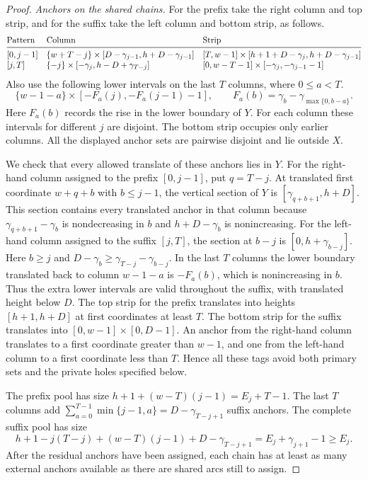 \documentclass[10pt]{article}
\numberwithin{equation}{section}
\theoremstyle{definition}
\begin{document}
\begin{proof}
\emph{Anchors on the shared chains.}
For the prefix take the right column and top strip, and for the suffix take the left column and bottom strip, as follows.
\[
\begin{array}{@{}l@{\quad}l@{\quad}l@{}}
 \text{Pattern}&\text{Column}&\text{Strip}\\
 \midrule
 {}[0,j-1]&\{w+T-j\}\times[D-\gamma_{j-1},h+D-\gamma_{j-1}]
         &[T,w-1]\times[h+1+D-\gamma_j,h+D-\gamma_{j-1}]\\
 {}[j,T]&\{-j\}\times[-\gamma_j,h-D+\gamma_{T-j}]
      &[0,w-T-1]\times[-\gamma_j,-\gamma_{j-1}-1]
\end{array}
\]
Also use the following lower intervals on the last $T$ columns, where $0\le a<T$.
\[
 \{w-1-a\}\times[-F_a(j),-F_a(j-1)-1],\qquad
 F_a(b)=\gamma_b-\gamma_{\max\{0,b-a\}} .
\]
Here $F_a(b)$ records the rise in the lower boundary of $Y$. For each column these intervals for different $j$ are disjoint. The bottom strip occupies only earlier columns. All the displayed anchor sets are pairwise disjoint and lie outside $X$.

We check that every allowed translate of these anchors lies in $Y$. For the right-hand column assigned to the prefix $[0,j-1]$, put $q=T-j$. At translated first coordinate $w+q+b$ with $b\le j-1$, the vertical section of $Y$ is $[\gamma_{q+b+1},h+D]$. This section contains every translated anchor in that column because $\gamma_{q+b+1}-\gamma_b$ is nondecreasing in $b$ and $h+D-\gamma_b$ is nonincreasing. For the left-hand column assigned to the suffix $[j,T]$, the section at $b-j$ is $[0,h+\gamma_{b-j}]$. Here $b\ge j$ and $D-\gamma_b\ge \gamma_{T-j}-\gamma_{b-j}$. In the last $T$ columns the lower boundary translated back to column $w-1-a$ is $-F_a(b)$, which is nonincreasing in $b$. Thus the extra lower intervals are valid throughout the suffix, with translated height below $D$. The top strip for the prefix translates into heights $[h+1,h+D]$ at first coordinates at least $T$. The bottom strip for the suffix translates into $[0,w-1]\times[0,D-1]$. An anchor from the right-hand column translates to a first coordinate greater than $w-1$, and one from the left-hand column to a first coordinate less than $T$. Hence all these tags avoid both primary sets and the private holes specified below.

The prefix pool has size $h+1+(w-T)(j-1)=E_j+T-1$. The last $T$ columns add $\sum_{a=0}^{T-1}\min\{j-1,a\}=D-\gamma_{T-j+1}$ suffix anchors. The complete suffix pool has size
\[
 h+1-j(T-j)+(w-T)(j-1)+D-\gamma_{T-j+1}=E_j+\gamma_{j+1}-1\ge E_j.
\]
After the residual anchors have been assigned, each chain has at least as many external anchors available as there are shared arcs still to assign.


\end{proof}
\end{document}
